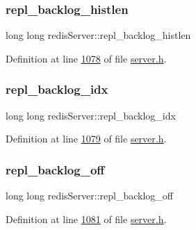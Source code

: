 \mbox{\label{structredisServer_af78da87b3bd1f7b6b44414db5cd55014}} 
\subsubsection{\texorpdfstring{repl\+\_\+backlog\+\_\+histlen}{repl\_backlog\_histlen}}
{\footnotesize\ttfamily long long redis\+Server\+::repl\+\_\+backlog\+\_\+histlen}



Definition at line \hyperlink{server_8h_source_l01078}{1078} of file \hyperlink{server_8h_source}{server.\+h}.

\mbox{\label{structredisServer_a16297c9c1e058213fdaf70b1a90b96a3}} 
\subsubsection{\texorpdfstring{repl\+\_\+backlog\+\_\+idx}{repl\_backlog\_idx}}
{\footnotesize\ttfamily long long redis\+Server\+::repl\+\_\+backlog\+\_\+idx}



Definition at line \hyperlink{server_8h_source_l01079}{1079} of file \hyperlink{server_8h_source}{server.\+h}.

\mbox{\label{structredisServer_a5b25bcced616d5e030212e6a15ce8116}} 
\subsubsection{\texorpdfstring{repl\+\_\+backlog\+\_\+off}{repl\_backlog\_off}}
{\footnotesize\ttfamily long long redis\+Server\+::repl\+\_\+backlog\+\_\+off}



Definition at line \hyperlink{server_8h_source_l01081}{1081} of file \hyperlink{server_8h_source}{server.\+h}.

